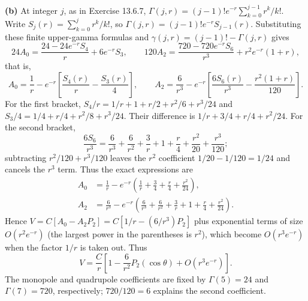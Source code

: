 \textbf{(b)} At integer $j$, as in Exercise 13.6.7,
$\Gamma(j,r)=(j-1)!e^{-r}\sum_{k=0}^{j-1}r^k/k!$.
Write $S_j(r)=\sum_{k=0}^j r^k/k!$, so
$\Gamma(j,r)=(j-1)!e^{-r}S_{j-1}(r)$.  Substituting these finite
upper-gamma formulas and $\gamma(j,r)=(j-1)!-\Gamma(j,r)$ gives
\[
24A_0=\frac{24-24e^{-r}S_4}{r}+6e^{-r}S_3,\qquad
120A_2=\frac{720-720e^{-r}S_6}{r^3}+r^2e^{-r}(1+r),
\]
that is,
\[
A_0=\frac1r-e^{-r}\left[\frac{S_4(r)}r-\frac{S_3(r)}4\right],
\qquad
A_2=\frac6{r^3}-e^{-r}\left[\frac{6S_6(r)}{r^3}
-\frac{r^2(1+r)}{120}\right].
\]
For the first bracket, $S_4/r=1/r+1+r/2+r^2/6+r^3/24$
and $S_3/4=1/4+r/4+r^2/8+r^3/24$. Their difference is
$1/r+3/4+r/4+r^2/24$.
For the second bracket,
\[
\frac{6S_6}{r^3}=\frac6{r^3}+\frac6{r^2}+\frac3r+1
+\frac r4+\frac{r^2}{20}+\frac{r^3}{120};
\]
subtracting $r^2/120+r^3/120$ leaves the $r^2$ coefficient
$1/20-1/120=1/24$ and cancels the $r^3$ term.
Thus the exact expressions are
\begin{align*}
A_0&=\frac1r-e^{-r}\left(\frac1r+\frac34+\frac r4+\frac{r^2}{24}\right),\\
A_2&=\frac6{r^3}-e^{-r}\left(\frac6{r^3}+\frac6{r^2}
+\frac3r+1+\frac r4+\frac{r^2}{24}\right).
\end{align*}
Hence $V=C[A_0-A_2P_2]=C[1/r-(6/r^3)P_2]$ plus exponential terms
of size $O(r^2e^{-r})$ (the largest power in the parentheses is
$r^2$), which become $O(r^3e^{-r})$ when the factor $1/r$ is
taken out.  Thus
\[
\boxed{V=\frac{C}{r}\left[1-\frac6{r^2}P_2(\cos\theta)
+O(r^3e^{-r})\right]}.
\]
The monopole and quadrupole coefficients are fixed by
$\Gamma(5)=24$ and $\Gamma(7)=720$, respectively;
$720/120=6$ explains the second coefficient.


